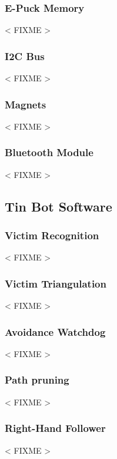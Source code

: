 \documentclass[a4paper,parskip,headheight=38pt]{scrartcl} %
\newcommand{\incomplete}[1]{\textless{} #1 \textgreater{}}
\begin{document}
\subsubsection{E-Puck Memory}
\incomplete{FIXME}

\subsubsection{I2C Bus}
\incomplete{FIXME}

\subsubsection{Magnets}
\incomplete{FIXME}

\subsubsection{Bluetooth Module}
\incomplete{FIXME}

\subsection{Tin Bot Software} %

\subsubsection{Victim Recognition}
\incomplete{FIXME}

\subsubsection{Victim Triangulation}
\incomplete{FIXME}

\subsubsection{Avoidance Watchdog}
\incomplete{FIXME}

\subsubsection{Path pruning}
\incomplete{FIXME}


\subsubsection{Right-Hand Follower} %
\incomplete{FIXME}
\end{document}
